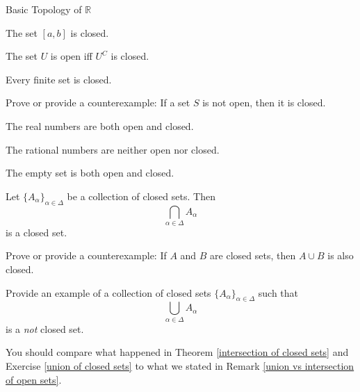 \begin{section}{Basic Topology of $\mathbb{R}$}
\begin{exercise}
\end{exercise}

\begin{theorem}[*]
The set $[a,b]$ is closed.
\end{theorem}

\begin{theorem}
The set $U$ is open iff $U^C$ is closed.
\end{theorem}

\begin{theorem}[*]
Every finite set is closed.
\end{theorem}

\begin{problem}
Prove or provide a counterexample: If a set $S$ is not open, then it is closed.
\end{problem}

\begin{theorem}
The real numbers are both open and closed.
\end{theorem}

\begin{theorem}
The rational numbers are neither open nor closed.
\end{theorem}

\begin{theorem}
The empty set is both open and closed.
\end{theorem}

\begin{theorem}[*]\label{intersection of closed sets}
Let $\{A_{\alpha}\}_{\alpha\in\Delta}$ be a collection of closed sets.  Then
\[
\bigcap_{\alpha\in \Delta} A_{\alpha}
\]
is a closed set.
\end{theorem}

\begin{problem}
Prove or provide a counterexample: If $A$ and $B$ are closed sets, then $A\cup B$ is also closed.
\end{problem}

\begin{exercise}\label{union of closed sets}
Provide an example of a collection of closed sets $\{A_{\alpha}\}_{\alpha\in\Delta}$ such that 
\[
\bigcup_{\alpha\in \Delta} A_{\alpha}
\]
is a \emph{not} closed set.
\end{exercise}

\begin{remark}
You should compare what happened in Theorem \ref{intersection of closed sets} and Exercise \ref{union of closed sets} to what we stated in Remark \ref{union vs intersection of open sets}.
\end{remark}

\end{section}


